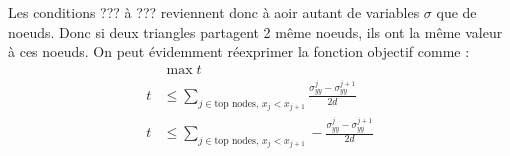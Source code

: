 Les conditions ??? à ??? reviennent donc à aoir autant de variables $\sigma$ que de noeuds. Donc si deux triangles partagent 2 même noeuds, ils ont la même valeur à ces noeuds. On peut évidemment réexprimer la fonction objectif comme : 
\begin{align*}
& \max  t \\
t &\leq \sum_{j \in \text{top nodes, $x_j < x_{j+1}$}} \frac{\sigma_{yy}^j - \sigma_{yy}^{j+1}}{2 d}\\
t &\leq  \sum_{j \in \text{top nodes, $x_j < x_{j+1}$}} - \frac{\sigma_{yy}^j - \sigma_{yy}^{j+1}}{2 d} 
\end{align*}



